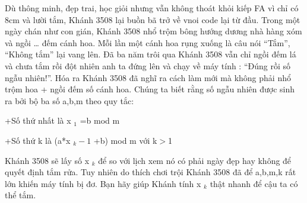 Dù thông minh, đẹp trai, học giỏi nhưng vẫn không thoát khỏi kiếp FA vì chỉ có 8cm và lười tắm, Khánh 3508 lại buồn bã trở về vnoi code lại từ đầu. Trong một ngày chán như con gián, Khánh 3508 nhổ trộm bông hướng dương nhà hàng xóm và ngồi … đếm cánh hoa. Mỗi lần một cánh hoa rụng xuống là câu nói “Tắm”, “Không tắm” lại vang lên. Đã ba năm trôi qua Khánh 3508 vẫn chỉ ngồi đếm lá và chưa tắm rồi đột nhiên anh ta đứng lên và chạy về máy tính : “Đúng rồi số ngẫu nhiên!”. Hóa ra Khánh 3508 đã nghĩ ra cách làm mới mà không phải nhổ trộm hoa + ngồi đếm số cánh hoa. Chúng ta biết rằng số ngẫu nhiên được sinh ra bởi bộ ba số a,b,m theo quy tắc:  

   +Số thứ nhất là x   $_    1   $   =b mod m  

   +Số thứ k là (a*x   $_    k-1   $   +b) mod m với k$>$1  

   Khánh 3508 sẽ lấy số x   $_    k   $   để so với lịch xem nó có phải ngày đẹp hay không để quyết định tắm rửa. Tuy nhiên do thích chơi trội Khánh 3508 đã để a,b,m,k rất lớn khiến máy tính bị đơ. Bạn hãy giúp Khánh tính x   $_    k   $   thật nhanh để cậu ta có thể tắm.  

\